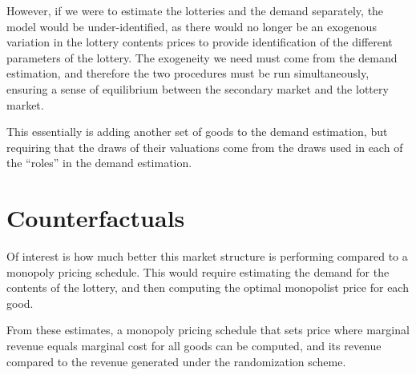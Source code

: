 \documentclass[12pt]{paper}
\begin{document}
However, if we were to estimate the lotteries and the demand
separately, the model would be under-identified, as there would no
longer be an exogenous variation in the lottery contents prices to
provide identification of the different parameters of the lottery. The
exogeneity we need must come from the demand estimation, and therefore
the two procedures must be run simultaneously, ensuring a sense of
equilibrium between the secondary market and the lottery market. 

This essentially is adding another set of goods to the demand
estimation, but requiring that the draws of their valuations come from
the draws used in each of the ``roles'' in the demand estimation.  



\section{Counterfactuals}

Of interest is how much better this market structure is performing
compared to a monopoly pricing schedule. This would require estimating
the demand for the contents of the lottery, and then computing the
optimal monopolist price for each good. 


From these estimates, a monopoly pricing schedule that sets price
where marginal revenue equals marginal cost for all goods can be
computed, and its revenue compared to the revenue generated under the
randomization scheme.



{}
\end{document}

